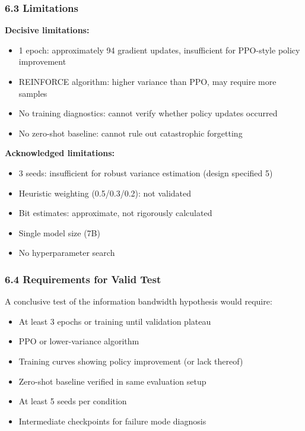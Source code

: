 \subsubsection{6.3 Limitations}

\textbf{Decisive limitations:}
\begin{itemize}
\item 1 epoch: approximately 94 gradient updates, insufficient for PPO-style policy improvement
\item REINFORCE algorithm: higher variance than PPO, may require more samples
\item No training diagnostics: cannot verify whether policy updates occurred
\item No zero-shot baseline: cannot rule out catastrophic forgetting
\end{itemize}

\textbf{Acknowledged limitations:}
\begin{itemize}
\item 3 seeds: insufficient for robust variance estimation (design specified 5)
\item Heuristic weighting (0.5/0.3/0.2): not validated
\item Bit estimates: approximate, not rigorously calculated
\item Single model size (7B)
\item No hyperparameter search
\end{itemize}

\subsubsection{6.4 Requirements for Valid Test}

A conclusive test of the information bandwidth hypothesis would require:
\begin{itemize}
\item At least 3 epochs or training until validation plateau
\item PPO or lower-variance algorithm
\item Training curves showing policy improvement (or lack thereof)
\item Zero-shot baseline verified in same evaluation setup
\item At least 5 seeds per condition
\item Intermediate checkpoints for failure mode diagnosis
\end{itemize}
